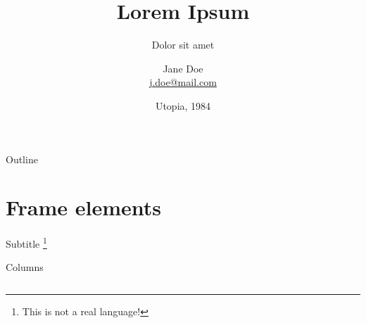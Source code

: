 \documentclass[%
  handout,
  aspectratio=1610,
  10pt,
  onlytextwidth, %
]{beamer}
\title[Lorem Ipsum]{Lorem Ipsum}
\subtitle{Dolor sit amet}
\date{Utopia, 1984}
\author[J. Doe]{Jane Doe\\\href{mailto:j.doe@mail.com}{j.doe@mail.com}}
\institute{Faculty of Pseodoscience}
\begin{document}
\maketitle

\begin{frame}
  \begin{abstract}
    \justifying
    \lipsum[1]
  \end{abstract}
\end{frame}

\begin{frame}{Outline}
  \tableofcontents
\end{frame}

\section{Frame elements}

\begin{frame}{\secname}{Subtitle}
  \lipsum[2]
  \footnote{This is not a real language!}
\end{frame}

\begin{frame}{\secname}{Columns}
  \begin{columns}
    \begin{column}[t]{0.49\textwidth}
      \justifying
      \lipsum[3][1-5]
    \end{column}
    \quad
    \begin{column}[t]{0.49\textwidth}
      \justifying
      \lipsum[3][6-10]
    \end{column}
  \end{columns}
\end{frame}
\end{document}
